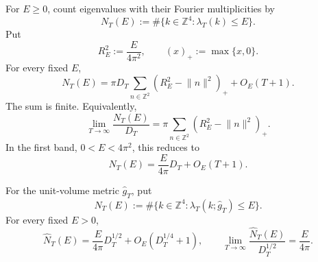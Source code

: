 \begin{proposition}
\label{cusp-spec-counting}
For \(E\ge0\), count eigenvalues with their Fourier multiplicities by
\begin{equation}
 N_T(E):=\#\{k\in\mathbb Z^4:\lambda_T(k)\le E\}.
 \label{cusp-spec-counting-definition}
\end{equation}
Put
\[
 R_E^2:=\frac{E}{4\pi^2},\qquad
 (x)_+:=\max\{x,0\}.
\]
For every fixed \(E\),
\begin{equation}
 N_T(E)
 =\pi D_T\sum_{n\in\mathbb Z^2}
        (R_E^2-\lVert n\rVert^2)_+ +O_E(T+1).
 \label{cusp-spec-fixed-energy-count}
\end{equation}
The sum is finite.  Equivalently,
\begin{equation}
 \lim_{T\to\infty}\frac{N_T(E)}{D_T}
 =\pi\sum_{n\in\mathbb Z^2}
        (R_E^2-\lVert n\rVert^2)_+.
 \label{cusp-spec-counting-density-limit}
\end{equation}
In the first band, \(0<E<4\pi^2\), this reduces to
\begin{equation}
 N_T(E)=\frac{E}{4\pi}D_T+O_E(T+1).
 \label{cusp-spec-first-band-count}
\end{equation}

For the unit-volume metric \(\widehat g_T\), put
\begin{equation}
 \widehat N_T(E):=
 \#\{k\in\mathbb Z^4:\lambda_T(k;\widehat g_T)\le E\}.
 \label{cusp-spec-unit-volume-count-definition}
\end{equation}
For every fixed \(E>0\),
\begin{equation}
 \widehat N_T(E)
 =\frac{E}{4\pi}D_T^{1/2}+O_E(D_T^{1/4}+1),
 \qquad
 \lim_{T\to\infty}\frac{\widehat N_T(E)}{D_T^{1/2}}
 =\frac{E}{4\pi}.
 \label{cusp-spec-unit-volume-count}
\end{equation}


\end{proposition}
